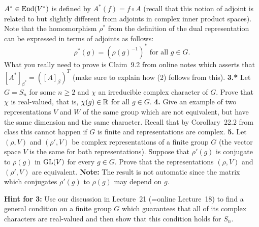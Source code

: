 \documentclass[12pt]{amsart}
\begin{document}
$A^*\in \mathrm {End}(V^*)$ is defined by $A^*(f)=f\circ A$ (recall that this notion of adjoint is related to but slightly different from adjoints in complex
inner product spaces). Note that the homomorphism $\rho^*$ from the definition of the dual representation can be expressed in terms of adjoints as follows:
$$ \rho^*(g)=(\rho(g)^{-1})^* \mbox{ for all }g\in G.$$
What you really need to prove is Claim~9.2 from online notes which asserts that $[A^*]_{\beta^*}=([A]_{\beta})^T$ (make sure to explain how (2) follows from this).
\skv
{\bf 3.*} Let $G=S_n$ for some $n\geq 2$ and $\chi$ an irreducible complex character of $G$. Prove that $\chi$ is real-valued, that is,
$\chi(g)\in {\mathbb R}$ for all $g\in G$. 
\skv
{\bf 4.} Give an example of two representations $V$ and $W$ of the same group which are not equivalent, but have the same dimension and the same character. Recall that by Corollary~22.2 from class this cannot happen if $G$ is finite and representations are complex.
\skv
{\bf 5.} Let $(\rho,V)$ and $(\rho',V)$ be complex representations of a finite group $G$ (the vector space $V$ is the same for both representations). Suppose that $\rho'(g)$ is conjugate to $\rho(g)$ in ${\rm GL}(V)$ for every $g\in G$. Prove that the representations $(\rho,V)$ and $(\rho',V)$ are equivalent. {\bf Note:} The result is not automatic since the matrix which conjugates
$\rho'(g)$ to $\rho(g)$ may depend on $g$.

\newpage
{\bf Hint for 3:} Use our discussion in Lecture~21 (=online Lecture~18) to find a general condition on a finite group $G$ which guarantees that all of its complex characters are real-valued and then show that this condition holds for $S_n$.
\end{document}

